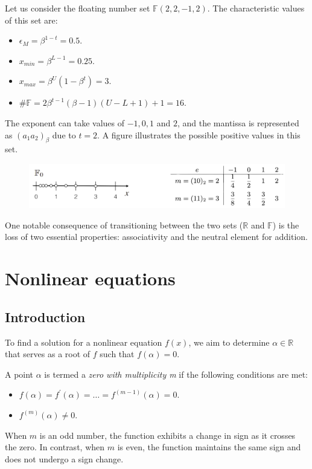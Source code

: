 \documentclass[12pt, a4paper]{report}
\begin{document}
    \begin{example}
        Let us consider the floating number set $\mathbb{F}(2,2,-1,2)$. 
        The characteristic values of this set are: 
        \begin{itemize}
            \item $\epsilon_M=\beta^{1-t}=0.5$.
            \item $x_{min}=\beta^{L-1}=0.25$.
            \item $x_{max}=\beta^U(1-\beta^t)=3$.
            \item $\#\mathbb{F}=2 \beta^{t-1}(\beta -1)(U-L+1)+1=16$. 
        \end{itemize}
        The exponent can take values of $-1,0,1$ and $2$, and the mantissa is represented as $(a_1a_2)_{\beta}$ due to $t=2$. 
        A figure illustrates the possible positive values in this set.
        \begin{figure}[H]
            \centering
            \includegraphics[width=0.9\linewidth]{images/numbers.png}
        \end{figure}
    \end{example}
    One notable consequence of transitioning between the two sets ($\mathbb{R}$ and $\mathbb{F}$) is the loss of two essential properties: associativity and the neutral element for addition.

\newpage 

\chapter{Nonlinear equations}
    \section{Introduction}
    To find a solution for a nonlinear equation $f(x)$, we aim to determine $\alpha \in \mathbb{R}$ that serves as a root of $f$ such that $f(\alpha)=0$.
    \begin{definition}
        A point $\alpha$  is termed a \emph{zero with multiplicity m} if the following conditions are met:
        \begin{itemize}
            \item $f(\alpha)=f^{'}(\alpha)=\dots=f^{\left(m-1\right)}(\alpha)=0$.
            \item $f^{\left(m\right)}(\alpha) \neq 0$.
        \end{itemize}
    \end{definition}
    When $m$ is an odd number, the function exhibits a change in sign as it crosses the zero. 
    In contrast, when $m$ is even, the function maintains the same sign and does not undergo a sign change.
\end{document}
